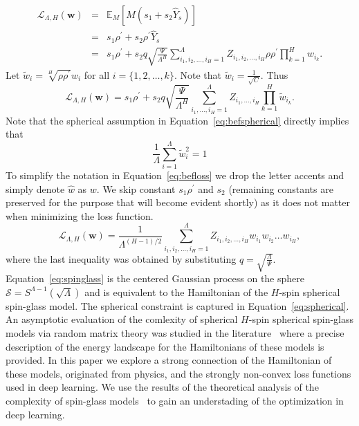 \documentclass[twoside]{article}
\begin{document}
\begin{eqnarray*}
\mathcal{L}_{\Lambda,H}({\bm w}) \!\!\!\!\!&=&\!\!\!\!\! \mathbb{E}_{M}[M(s_1 + s_2\hat{Y}_s)]\\
&=& \!\!\!\!\!s_1\rho^{'} \!+\! s_2\rho^{'}\hat{Y}_s\\
&=& \!\!\!\!\!s_1\rho^{'} \!+\! s_2q\sqrt{\!\!\frac{\Psi}{\Lambda^H}\!\!\!\!}\sum_{i_1,i_2,\dots,i_H=1}^{\Lambda}\!\!\!\!\!\!\!Z_{i_1,i_2,\dots,i_H}\rho\rho^{'}\prod_{k = 1}^{H}w_{i_k}.
\end{eqnarray*}
Let $\tilde{w}_i = \sqrt[H]{\rho\rho^{'}}w_i$ for all $i = \{1,2,\dots,k\}$. Note that $\tilde{w}_i = \frac{1}{\sqrt{C}}$. Thus
\begin{equation}
\mathcal{L}_{\Lambda,H}({\bm w}) = s_1\rho^{'} \!+\! s_2q\sqrt{\!\!\frac{\Psi}{\Lambda^H}\!\!\!\!}\sum_{i_1,\dots,i_H=1}^{\Lambda}\!\!\!\!Z_{i_1,\dots,i_H}\prod_{k = 1}^{H}\tilde{w}_{i_k}.
\label{eq:befloss}
\end{equation}
Note that the spherical assumption in Equation~\ref{eq:befspherical} directly implies that
\begin{equation}
\frac{1}{\Lambda}\sum_{i=1}^{\Lambda}\tilde{w}_i^2 = 1
\label{eq:spherical}
\end{equation}
To simplify the notation in Equation~\ref{eq:befloss} we drop the letter accents and simply denote $\hat{w}$ as $w$. We skip constant $s_1\rho^{'}$ and $s_2$ (remaining constants are preserved for the purpose that will become evident shortly) as it does not matter when minimizing the loss function.
\begin{equation}
\mathcal{L}_{\Lambda,H}({\bm w}) = \frac{1}{\Lambda^{(H-1)/2}}\!\!\!\!\sum_{i_1,i_2,\dots,i_H=1}^{\Lambda}\!\!\!\!\!\!\!Z_{i_1,i_2,\dots,i_H}w_{i_1}w_{i_2}\dots\!w_{i_H},
\label{eq:spinglass}
\end{equation}
where the last inequality was obtained by substituting $q = \sqrt{\frac{\Lambda}{\Psi}}$. Equation~\ref{eq:spinglass} is the centered Gaussian process on the sphere $\mathcal{S} = S^{\Lambda-1}(\sqrt{\Lambda})$ and is equivalent to the Hamiltonian of the $H$-spin spherical spin-glass model. The spherical constraint is captured in Equation~\ref{eq:spherical}. An asymptotic evaluation of the comlexity of spherical $H$-spin spherical spin-glass models via random matrix theory was studied in the literature~\cite{AAC2010} where a precise description of the energy landscape for the Hamiltonians of these models is provided. In this paper we explore a strong connection of the Hamiltonian of these models, originated from physics, and the strongly non-convex loss functions used in deep learning. We use the results of the theoretical analysis of the complexity of spin-glass models~\cite{AAC2010} to gain an understading of the optimization in deep learning. 
\end{document}
